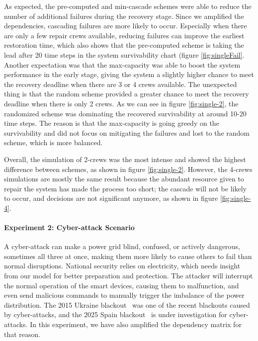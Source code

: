 \documentclass[conference]{IEEEtran}
\begin{document}
As expected, the pre-computed and min-cascade schemes were able to reduce the number of additional failures during the recovery stage. Since we amplified the dependencies, cascading failures are more likely to occur. Especially when there are only a few repair crews available, reducing failures can improve the earliest restoration time, which also shows that the pre-computed scheme is taking the lead after 20 time steps in the system survivability chart (figure \ref{fig:singleFail}. 
Another expectation was that the max-capacity was able to boost the system performance in the early stage, giving the system a slightly higher chance to meet the recovery deadline when there are 3 or 4 crews available. The unexpected thing is that the random scheme provided a greater chance to meet the recovery deadline when there is only 2 crews. As we can see in figure \ref{fig:single-2}, the randomized scheme was dominating the recovered survivability at around 10-20 time steps. The reason is that the max-capacity is going greedy on the survivability and did not focus on mitigating the failures and lost to the random scheme, which is more balanced.

Overall, the simulation of 2-crews was the most intense and showed the highest difference between schemes, as shown in figure \ref{fig:single-2}. However, the 4-crews simulations are mostly the same result because the abundant resource given to repair the system has made the process too short; the cascade will not be likely to occur, and decisions are not significant anymore, as shown in figure \ref{fig:single-4}. \\

\paragraph{Experiment 2: Cyber-attack Scenario}
A cyber-attack can make a power grid blind, confused, or actively dangerous, sometimes all three at once, making them more likely to cause others to fail than normal disruptions. National security relies on electricity, which needs insight from our model for better preparation and protection. The attacker will interrupt the normal operation of the smart devices, causing them to malfunction, and even send malicious commands to manually trigger the imbalance of the power distribution. The 2015 Ukraine blackout~\cite{liang_2015_2017} was one of the recent blackouts caused by cyber-attacks, and the 2025 Spain blackout~\cite{cetinkaya_technical_2025} is under investigation for cyber-attacks. In this experiment, we have also amplified the dependency matrix for that reason.
\end{document}
